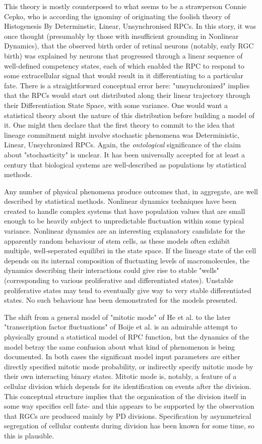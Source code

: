 \documentclass{ut-thesis}
\begin{document}
This theory is mostly counterposed to what seems to be a strawperson Connie Cepko, who is according the ignominy of originating the foolish theory of Histogenesis By Determinstic, Linear, Unsynchronised RPCs. In this story, it was once thought (presumably by those with insufficient grounding in Nonlinear Dynamics), that the observed birth order of retinal neurons (notably, early RGC birth) was explained by neurons that progressed through a linear sequence of well-defined competency states, each of which enabled the RPC to respond to some extracellular signal that would result in it differentiating to a particular fate. There is a straightforward conceptual error here: "unsynchronized" implies that the RPCs would start out distributed along their linear trajectory through their Differentiation State Space, with some variance. One would want a statistical theory about the nature of this distribution before building a model of it. One might then declare that the first theory to commit to the idea that lineage commitment might involve stochastic phenomena was Deterministic, Linear, Unsychronized RPCs. Again, the \textit{ontological} significance of the claim about "stochasticity" is unclear. It has been universally accepted for at least a century that biological systems are well-described as populations by statistical methods.

Any number of physical phenomena produce outcomes that, in aggregate, are well described by statistical methods. Nonlinear dynamics techniques have been created to handle complex systems that have population values that are small enough to be heavily subject to unpredictable fluctuation within some typical variance. Nonlinear dynamics are an interesting explanatory candidate for the apparently random behaviour of stem cells, as these models often exhibit multiple, well-seperated equilibri in the state space. If the lineage state of the cell depends on its internal composition of fluctuating levels of macromolecules, the dynamics describing their interactions could give rise to stable "wells" (corresponding to various proliferative and differentiated states). Unstable proliferative states may tend to eventually give way to very stable differentiated states. No such behaviour has been demonstrated for the models presented.

The shift from a general model of "mitotic mode" of He et al. to the later "transcription factor fluctuations" of Boije et al. is an admirable attempt to physically ground a statistical model of RPC function, but the dynamics of the model betray the same confusion about what kind of phenomenon is being documented. In both cases the significant model input parameters are either directly specified mitotic mode probability, or indirectly specify mitotic mode by their own interacting binary states. Mitotic mode is, notably, a feature of a cellular division which depends for its identification on events after the division. This conceptual structure implies that the organisation of the division itself in some way specifies cell fate- and this appears to be supported by the observation that RGCs are produced mainly by PD divisions. Specification by asymmetrical segregation of cellular contents during division has been known for some time, so this is plausible.
\end{document}
